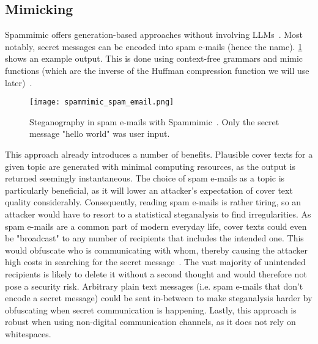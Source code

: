 \subsection{Mimicking}
\label{sec:mimicking}
Spammimic offers generation-based approaches without involving \glspl{LLM}~\cite{spammimicSpammimic2000}. Most notably, secret messages can be encoded into spam e-mails (hence the name). \cref{fig:spammimicSpamEmail} shows an example output. This is done using context-free grammars and mimic functions (which are the inverse of the Huffman compression function we will use later)~\cite{waynerMimicFunctions1992,bennettLinguisticSteganographySurvey2004}.

\begin{figure}
    \begin{wide}
        \centering
        \captionsetup{width=\linewidth}
        \texttt{[image: spammimic\_spam\_email.png]}
        \caption[Spammimic: Spam e-mail]{Steganography in spam e-mails with Spammimic~\cite{spammimicSpammimic2000}. Only the secret message "hello world" was user input.}
        \label{fig:spammimicSpamEmail}
    \end{wide}
\end{figure}

This approach already introduces a number of benefits. Plausible cover texts for a given topic are generated with minimal computing resources, as the output is returned seemingly instantaneous. The choice of spam e-mails as a topic is particularly beneficial, as it will lower an attacker's expectation of cover text quality considerably. Consequently, reading spam e-mails is rather tiring, so an attacker would have to resort to a statistical steganalysis to find irregularities. As spam e-mails are a common part of modern everyday life, cover texts could even be "broadcast" to any number of recipients that includes the intended one. This would obfuscate who is communicating with whom, thereby causing the attacker high costs in searching for the secret message~\cite{bennettLinguisticSteganographySurvey2004,petitcolasInformationHidingSurvey1999}. The vast majority of unintended recipients is likely to delete it without a second thought and would therefore not pose a security risk. Arbitrary plain text messages (i.e. spam e-mails that don't encode a secret message) could be sent in-between to make steganalysis harder by obfuscating when secret communication is happening. Lastly, this approach is robust when using non-digital communication channels, as it does not rely on whitespaces.

